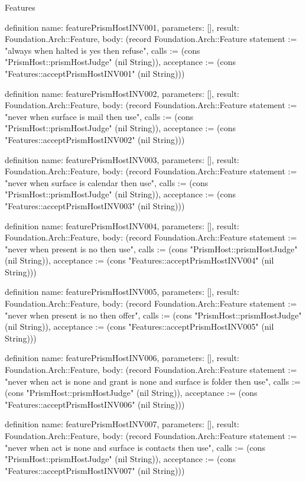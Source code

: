 \begin{lexlean}{Features}
\begin{semanticmodule}
definition{
  name: featurePrismHostINV001,
  parameters: [],
  result: Foundation.Arch::Feature,
  body: (record Foundation.Arch::Feature {statement := "always when halted is yes then refuse", calls := (cons "PrismHost::prismHostJudge" (nil String)), acceptance := (cons "Features::acceptPrismHostINV001" (nil String))})
}

definition{
  name: featurePrismHostINV002,
  parameters: [],
  result: Foundation.Arch::Feature,
  body: (record Foundation.Arch::Feature {statement := "never when surface is mail then use", calls := (cons "PrismHost::prismHostJudge" (nil String)), acceptance := (cons "Features::acceptPrismHostINV002" (nil String))})
}

definition{
  name: featurePrismHostINV003,
  parameters: [],
  result: Foundation.Arch::Feature,
  body: (record Foundation.Arch::Feature {statement := "never when surface is calendar then use", calls := (cons "PrismHost::prismHostJudge" (nil String)), acceptance := (cons "Features::acceptPrismHostINV003" (nil String))})
}

definition{
  name: featurePrismHostINV004,
  parameters: [],
  result: Foundation.Arch::Feature,
  body: (record Foundation.Arch::Feature {statement := "never when present is no then use", calls := (cons "PrismHost::prismHostJudge" (nil String)), acceptance := (cons "Features::acceptPrismHostINV004" (nil String))})
}

definition{
  name: featurePrismHostINV005,
  parameters: [],
  result: Foundation.Arch::Feature,
  body: (record Foundation.Arch::Feature {statement := "never when present is no then offer", calls := (cons "PrismHost::prismHostJudge" (nil String)), acceptance := (cons "Features::acceptPrismHostINV005" (nil String))})
}

definition{
  name: featurePrismHostINV006,
  parameters: [],
  result: Foundation.Arch::Feature,
  body: (record Foundation.Arch::Feature {statement := "never when act is none and grant is none and surface is folder then use", calls := (cons "PrismHost::prismHostJudge" (nil String)), acceptance := (cons "Features::acceptPrismHostINV006" (nil String))})
}

definition{
  name: featurePrismHostINV007,
  parameters: [],
  result: Foundation.Arch::Feature,
  body: (record Foundation.Arch::Feature {statement := "never when act is none and surface is contacts then use", calls := (cons "PrismHost::prismHostJudge" (nil String)), acceptance := (cons "Features::acceptPrismHostINV007" (nil String))})
}


\end{semanticmodule}
\end{lexlean}
